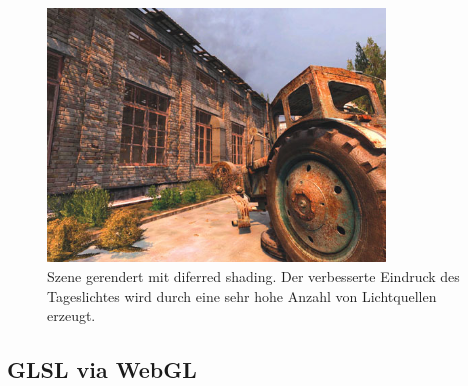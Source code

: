 \begin{figure}[H]
    \centering
    \includegraphics[width=0.8\textwidth]{images/deferred_shading_on.jpg}
    \caption{Szene gerendert mit  diferred shading. Der verbesserte  Eindruck des Tageslichtes wird durch eine sehr hohe Anzahl von Lichtquellen erzeugt.} %
    \label{fig:defferedshading}
\end{figure}



\subsection{GLSL via WebGL}

